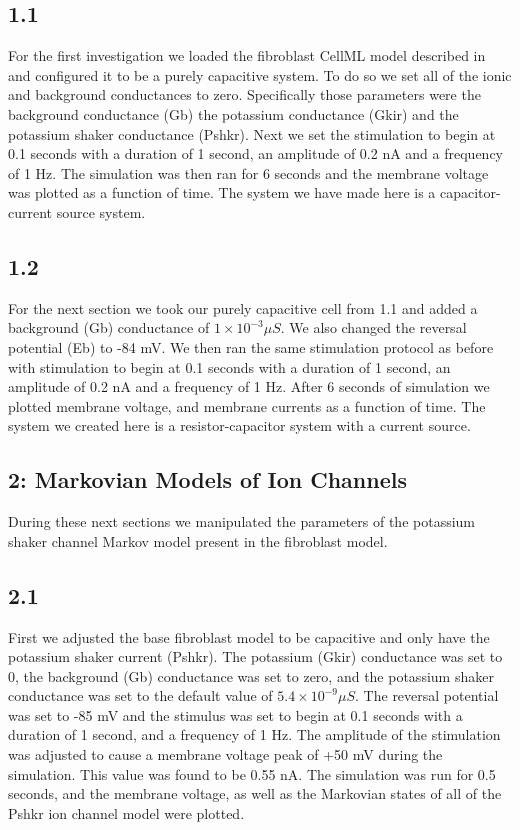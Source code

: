 \documentclass[11pt]{article}
\begin{document}
\subsection{1.1}
\par{}
For the first investigation we loaded the fibroblast CellML model described in \cite{Sachse2008} and configured it to be a purely capacitive system. To do so we set all of the ionic and background conductances to zero. Specifically those parameters were the background conductance (Gb) the potassium conductance (Gkir) and the potassium shaker conductance (Pshkr). Next we set the stimulation to begin at 0.1 seconds with a duration of 1 second, an amplitude of 0.2 nA and a frequency of 1 Hz. The simulation was then ran for 6 seconds and the membrane voltage was plotted as a function of time. The system we have made here is a capacitor-current source system. 

\subsection{1.2}
\par{}
For the next section we took our purely capacitive cell from 1.1 and added a background (Gb) conductance of \ensuremath{1\times{}10^{-3}\mu S}. We also changed the reversal potential (Eb) to -84 mV. We then ran the same stimulation protocol as before with stimulation to begin at 0.1 seconds with a duration of 1 second, an amplitude of 0.2 nA and a frequency of 1 Hz. After 6 seconds of simulation we plotted membrane voltage, and membrane currents as a function of time. The system we created here is a resistor-capacitor system with a current source.

\subsection{2: Markovian Models of Ion Channels}
\par{}
During these next sections we manipulated the parameters of the potassium shaker channel Markov model present in the fibroblast model.

\subsection{2.1}
\par{}
First we adjusted the base fibroblast model to be capacitive and only have the potassium shaker current (Pshkr). The potassium (Gkir) conductance was set to 0, the background (Gb) conductance was set to zero, and the potassium shaker conductance was set to the default value of \ensuremath{5.4 \times{}10^{-9}\mu S}. The reversal potential was set to -85 mV and the stimulus was set to begin at 0.1 seconds with a duration of 1 second, and a frequency of 1 Hz. The amplitude of the stimulation was adjusted to cause a membrane voltage peak of +50 mV during the simulation. This value was found to be 0.55 nA. The simulation was run for 0.5 seconds, and the membrane voltage, as well as the Markovian states of all of the Pshkr ion channel model were plotted.
\end{document}
